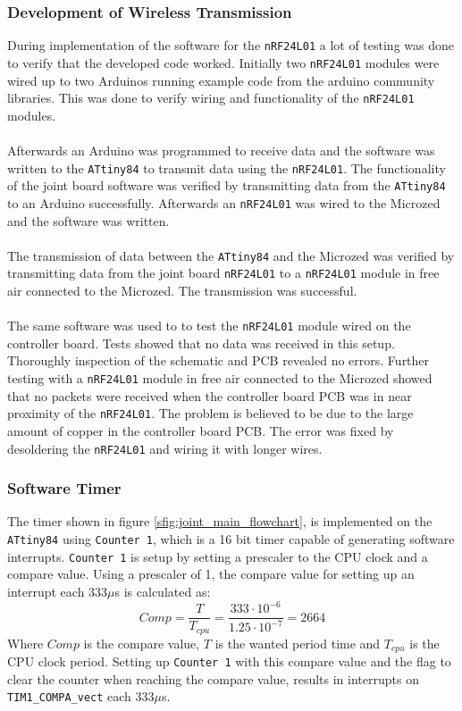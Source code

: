 {\subsubsection{Development of Wireless Transmission}
\label{subs:wireless_transmission_joint}
During implementation of the software for the \texttt{nRF24L01} a lot of testing was done to verify that the developed code worked.
Initially two \texttt{nRF24L01} modules were wired up to two Arduinos running example code from the arduino community libraries. 
This was done to verify wiring and functionality of the \texttt{nRF24L01} modules.
\\~\\
Afterwards an Arduino was programmed to receive data and the software was written to the \texttt{ATtiny84} to transmit data using the \texttt{nRF24L01}.
The functionality of the joint board software was verified by transmitting data from the \texttt{ATtiny84} to an Arduino successfully.
Afterwards an \texttt{nRF24L01} was wired to the Microzed and the software was written.
\\~\\
The transmission of data between the \texttt{ATtiny84} and the Microzed was verified by transmitting data from the joint board \texttt{nRF24L01} to a \texttt{nRF24L01} module in free air connected to the Microzed.
The transmission was successful.
\\~\\
The same software was used to to test the \texttt{nRF24L01} module wired on the controller board. 
Tests showed that no data was received in this setup.
Thoroughly inspection of the schematic and PCB revealed no errors. 
Further testing with a \texttt{nRF24L01} module in free air connected to the Microzed showed that no packets were received when the controller board PCB was in near proximity of the \texttt{nRF24L01}.
The problem is believed to be due to the large amount of copper in the controller board PCB.
The error was fixed by desoldering the \texttt{nRF24L01} and wiring it with longer wires.

\subsubsection{Software Timer}
\label{ssub:software_timer}
The timer shown in figure \ref{sfig:joint_main_flowchart}, is implemented on the \texttt{ATtiny84} using \texttt{Counter 1}, which is a 16 bit timer capable of generating software interrupts.
\texttt{Counter 1} is setup by setting a prescaler to the CPU clock and a compare value.
Using a prescaler of 1, the compare value for setting up an interrupt each 333$\mu$s is calculated as:
\begin{equation}
	Comp = \frac{T}{T_{cpu}} = \frac{333 \cdot 10^{-6}}{1.25\cdot 10^{-7}} = 2664
\end{equation}
Where $Comp$ is the compare value, $T$ is the wanted period time and $T_{cpu}$ is the CPU clock period.
Setting up \texttt{Counter 1} with this compare value and the flag to clear the counter when reaching the compare value, results in interrupts on \texttt{TIM1\_COMPA\_vect} each 333$\mu$s.

}
